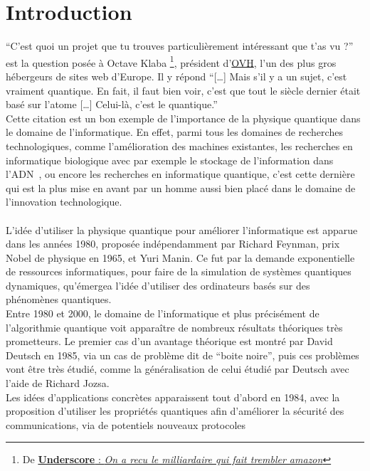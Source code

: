 \chapter{Introduction}\label{ch:introduction}

``C'est quoi un projet que tu trouves particulièrement intéressant que t'as vu ?'' est la question posée
à Octave Klaba \footnote{De \href{https://www.youtube.com/watch?v=GRnWBIJb_Oo}{\textbf{Underscore\textunderscore} :
\textit{On a recu le milliardaire qui fait trembler amazon}}}, président d'\href{https://www.ovhcloud.com/fr/}{OVH}, l'un des plus gros hébergeurs
de sites web d'Europe.
Il y répond ``[\ldots] Mais s'il y a un sujet, c'est vraiment quantique.
En fait, il faut bien voir, c'est que tout le siècle dernier était basé sur l'atome [\ldots] Celui-là,
c'est le quantique.'' \\
Cette citation est un bon exemple de l'importance de la physique quantique dans le domaine
de l'informatique.
En effet, parmi tous les domaines de recherches technologiques, comme l'amélioration des machines
existantes, les recherches en informatique biologique avec par exemple le stockage de l'information
dans l'ADN~\cite{wiki:natural-computing}, ou encore les recherches en informatique quantique, c'est cette dernière qui est la plus
mise en avant par un homme aussi bien placé dans le domaine de l'innovation technologique. \\ \\
L'idée d'utiliser la physique quantique pour améliorer l'informatique est apparue dans les années 1980,
proposée indépendamment par Richard Feynman, prix Nobel de physique en 1965, et Yuri Manin.
Ce fut par la demande exponentielle de ressources informatiques, pour faire de la simulation de systèmes quantiques
dynamiques, qu'émergea l'idée d'utiliser des ordinateurs basés sur des phénomènes quantiques.\\
Entre 1980 et 2000, le domaine de l'informatique et plus précisément de l'algorithmie quantique
voit apparaître de nombreux résultats théoriques très prometteurs.
Le premier cas d'un avantage théorique est montré par David Deutsch en 1985, via un cas de problème
dit de ``boite noire'', puis ces problèmes vont être très étudié, comme la généralisation de celui étudié
par Deutsch avec l'aide de Richard Jozsa.\\
Les idées d'applications concrètes apparaissent tout d'abord en 1984, avec la proposition d'utiliser les
propriétés quantiques afin d'améliorer la sécurité des communications, via de potentiels nouveaux protocoles
